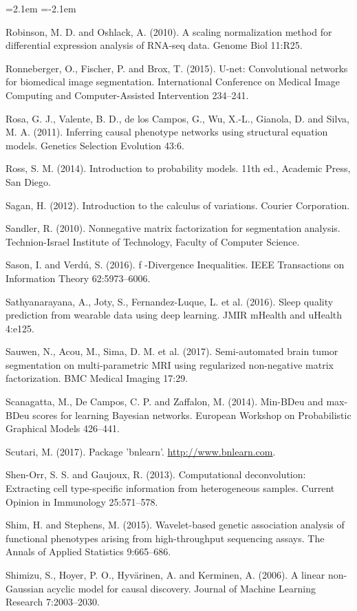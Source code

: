 \begin{list}{}{\leftmargin=2.1em  
  \itemindent=-2.1em \parsep=0pt \itemsep=2pt \topsep=0pt}
\item Robinson, M. D. and Oshlack, A. (2010). A scaling normalization method for differential expression analysis of RNA-seq data. Genome Biol 11:R25.
\item Ronneberger, O., Fischer, P. and Brox, T. (2015). U-net: Convolutional networks for biomedical image segmentation. International Conference on Medical Image Computing and Computer-Assisted Intervention 234--241.
\item Rosa, G. J., Valente, B. D., de los Campos, G., Wu, X.-L., Gianola, D. and Silva, M. A. (2011). Inferring causal phenotype networks using structural equation models. Genetics Selection Evolution 43:6.
\item Ross, S. M. (2014). Introduction to probability models. 11th ed., Academic Press, San Diego.
\item Sagan, H. (2012). Introduction to the calculus of variations. Courier Corporation.
\item Sandler, R. (2010). Nonnegative matrix factorization for segmentation analysis. Technion-Israel Institute of Technology, Faculty of Computer Science.
\item Sason, I. and Verdú, S. (2016). f -Divergence Inequalities. IEEE Transactions on Information Theory 62:5973--6006.
\item Sathyanarayana, A., Joty, S., Fernandez-Luque, L. et al. (2016). Sleep quality prediction from wearable data using deep learning. JMIR mHealth and uHealth 4:e125.
\item Sauwen, N., Acou, M., Sima, D. M. et al. (2017). Semi-automated brain tumor segmentation on multi-parametric MRI using regularized non-negative matrix factorization. BMC Medical Imaging 17:29.
\item Scanagatta, M., De Campos, C. P. and Zaffalon, M. (2014). Min-BDeu and max-BDeu scores for learning Bayesian networks. European Workshop on Probabilistic Graphical Models 426--441.
\item Scutari, M. (2017). Package 'bnlearn'. \url{http://www.bnlearn.com}.
\item Shen-Orr, S. S. and Gaujoux, R. (2013). Computational deconvolution: Extracting cell type-specific information from heterogeneous samples. Current Opinion in Immunology 25:571--578.
\item Shim, H. and Stephens, M. (2015). Wavelet-based genetic association analysis of functional phenotypes arising from high-throughput sequencing assays. The Annals of Applied Statistics 9:665--686.
\item Shimizu, S., Hoyer, P. O., Hyvärinen, A. and Kerminen, A. (2006). A linear non-Gaussian acyclic model for causal discovery. Journal of Machine Learning Research 7:2003--2030.

\end{list}
